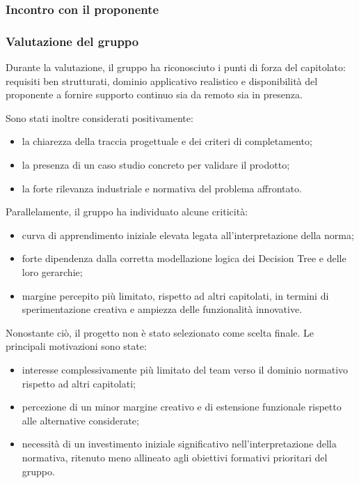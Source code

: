 \documentclass[a4paper,12pt]{article}
\begin{document}
\subsubsection{Incontro con il proponente}

\subsubsection{Valutazione del gruppo}

Durante la valutazione, il gruppo ha riconosciuto i punti di forza del capitolato: requisiti ben strutturati, dominio applicativo realistico e disponibilità del proponente a fornire supporto continuo sia da remoto sia in presenza.

Sono stati inoltre considerati positivamente:

\begin{itemize}
    \item la chiarezza della traccia progettuale e dei criteri di completamento;
    \item la presenza di un caso studio concreto per validare il prodotto;
    \item la forte rilevanza industriale e normativa del problema affrontato.
\end{itemize}

Parallelamente, il gruppo ha individuato alcune criticità:

\begin{itemize}
    \item curva di apprendimento iniziale elevata legata all'interpretazione della norma;
    \item forte dipendenza dalla corretta modellazione logica dei Decision Tree e delle loro gerarchie;
    \item margine percepito più limitato, rispetto ad altri capitolati, in termini di sperimentazione creativa e ampiezza delle funzionalità innovative.
\end{itemize}

Nonostante ciò, il progetto non è stato selezionato come scelta finale. Le principali motivazioni sono state:

\begin{itemize}
    \item interesse complessivamente più limitato del team verso il dominio normativo rispetto ad altri capitolati;
    \item percezione di un minor margine creativo e di estensione funzionale rispetto alle alternative considerate;
    \item necessità di un investimento iniziale significativo nell'interpretazione della normativa, ritenuto meno allineato agli obiettivi formativi prioritari del gruppo.
\end{itemize}
\end{document}
